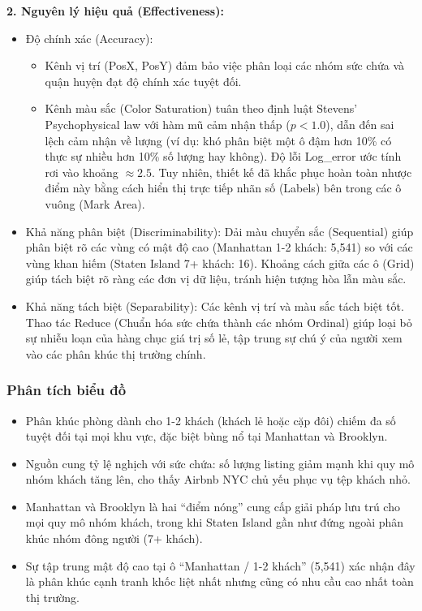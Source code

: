 \textbf{2. Nguyên lý hiệu quả (Effectiveness):}

\begin{itemize}
    \item Độ chính xác (Accuracy):
    \begin{itemize}
        \item Kênh vị trí (PosX, PosY) đảm bảo việc phân loại các nhóm sức chứa và quận huyện đạt độ chính xác tuyệt đối.
        \item Kênh màu sắc (Color Saturation) tuân theo định luật Stevens' Psychophysical law với hàm mũ cảm nhận thấp ($p < 1.0$), dẫn đến sai lệch cảm nhận về lượng (ví dụ: khó phân biệt một ô đậm hơn 10\% có thực sự nhiều hơn 10\% số lượng hay không). Độ lỗi Log\_error ước tính rơi vào khoảng $\approx 2.5$. Tuy nhiên, thiết kế đã khắc phục hoàn toàn nhược điểm này bằng cách hiển thị trực tiếp nhãn số (Labels) bên trong các ô vuông (Mark Area).
    \end{itemize}
    \item Khả năng phân biệt (Discriminability): Dải màu chuyển sắc (Sequential) giúp phân biệt rõ các vùng có mật độ cao (Manhattan 1-2 khách: 5,541) so với các vùng khan hiếm (Staten Island 7+ khách: 16). Khoảng cách giữa các ô (Grid) giúp tách biệt rõ ràng các đơn vị dữ liệu, tránh hiện tượng hòa lẫn màu sắc.
    \item Khả năng tách biệt (Separability): Các kênh vị trí và màu sắc tách biệt tốt. Thao tác Reduce (Chuẩn hóa sức chứa thành các nhóm Ordinal) giúp loại bỏ sự nhiễu loạn của hàng chục giá trị số lẻ, tập trung sự chú ý của người xem vào các phân khúc thị trường chính.
\end{itemize}

\subsubsection{Phân tích biểu đồ}

\begin{itemize}
    \item Phân khúc phòng dành cho 1-2 khách (khách lẻ hoặc cặp đôi) chiếm đa số tuyệt đối tại mọi khu vực, đặc biệt bùng nổ tại Manhattan và Brooklyn.
    \item Nguồn cung tỷ lệ nghịch với sức chứa: số lượng listing giảm mạnh khi quy mô nhóm khách tăng lên, cho thấy Airbnb NYC chủ yếu phục vụ tệp khách nhỏ.
    \item Manhattan và Brooklyn là hai ``điểm nóng'' cung cấp giải pháp lưu trú cho mọi quy mô nhóm khách, trong khi Staten Island gần như đứng ngoài phân khúc nhóm đông người (7+ khách).
    \item Sự tập trung mật độ cao tại ô ``Manhattan / 1-2 khách'' (5,541) xác nhận đây là phân khúc cạnh tranh khốc liệt nhất nhưng cũng có nhu cầu cao nhất toàn thị trường.
\end{itemize}
